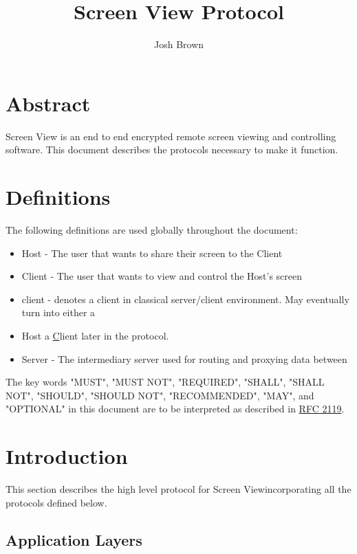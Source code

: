 \documentclass{article}
\title{Screen View Protocol}
\author{Josh Brown}
\newcommand{\projectName}{Screen View}
\begin{document}
    \maketitle
    \newpage


    \section{Abstract}
    \projectName{} is an end to end encrypted remote screen viewing and controlling software. This document describes
    the protocols necessary to make it function.
    \newpage


    \tableofcontents
    \newpage


    \section{Definitions}
    The following definitions are used globally throughout the document:

    \begin{itemize}
        \item Host - The user that wants to share their screen to the Client
        \item Client - The user that wants to view and control the Host's screen
        \item client - denotes a client in classical server/client environment. May eventually turn into either a
        \item Host a \underline{C}lient later in the protocol.
        \item Server - The intermediary server used for routing and proxying data between
    \end{itemize}


    The key words "MUST", "MUST NOT", "REQUIRED", "SHALL", "SHALL NOT",
    "SHOULD", "SHOULD NOT", "RECOMMENDED", "MAY", and "OPTIONAL" in this
    document are to be interpreted as described in \href{https://datatracker.ietf.org/doc/html/rfc2119}{RFC 2119}.

    \newpage


    \section{Introduction}

    This section describes the high level protocol for \projectName incorporating all the protocols defined below.\\

    \subsection{Application Layers}
\end{document}
